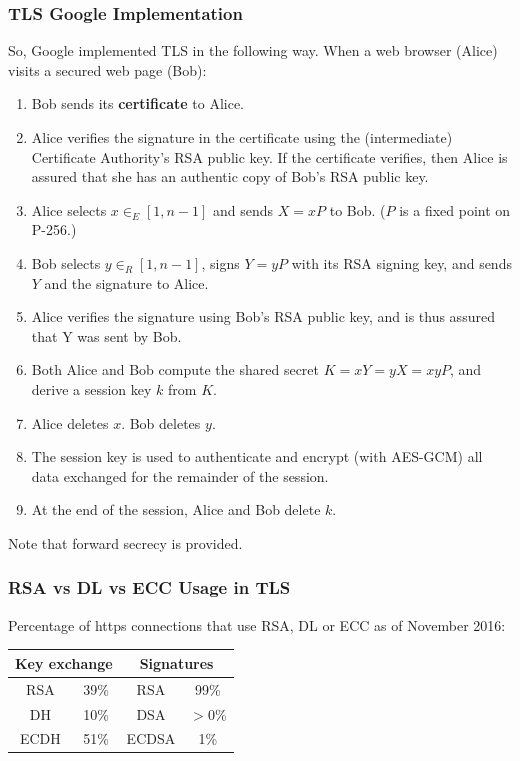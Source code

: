 \documentclass[12pt,titlepage]{article}
\begin{document}
\subsubsection{TLS Google Implementation}
So, Google implemented TLS in the following way. When a web browser (Alice) visits a secured web page (Bob):\begin{enumerate}
	\item Bob sends its \textbf{certificate} to Alice.
	\item Alice verifies the signature in the certificate using the (intermediate) Certificate Authority’s RSA public key. If the certificate verifies, then Alice is assured that she has an authentic copy of Bob’s RSA public key.
	\item Alice selects $x \in_E [1, n-1]$ and sends $X = xP$ to Bob. ($P$ is a fixed point on P-256.)
	\item Bob selects $y \in_R [1, n-1]$, signs $Y = yP$ with its RSA signing key, and sends $Y$ and the signature to Alice.
	\item Alice verifies the signature using Bob’s RSA public key, and is thus assured that Y was sent by Bob.
	\item Both Alice and Bob compute the shared secret $K = xY = yX = xyP$, and derive a session key $k$ from $K$.
	\item Alice deletes $x$. Bob deletes $y$.
	\item The session key is used to authenticate and encrypt (with AES-GCM) all data exchanged for the remainder of the session.
	\item At the end of the session, Alice and Bob delete $k$.
\end{enumerate}

Note that forward secrecy is provided.
\subsubsection{RSA vs DL vs ECC Usage in TLS}
Percentage of https connections that use RSA, DL or ECC as of November 2016: \begin{center}
	\begin{tabular}{|c|c|c|c|}
		\hline
		\multicolumn{2}{|c|}{Key exchange} & \multicolumn{2}{|c|}{Signatures}\\
		\hline
		RSA& 39\% & RSA & 99\%\\
		DH & 10\% & DSA & $>0$\%\\
		ECDH & 51\% & ECDSA & 1\%\\
		\hline
	\end{tabular}
\end{center}
\end{document}
